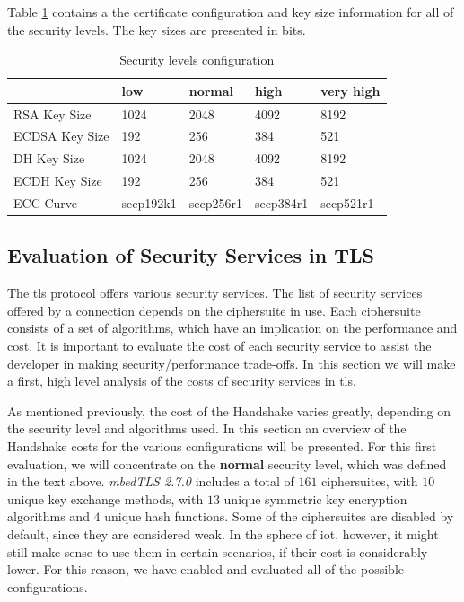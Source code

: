 Table \ref{table:sls-config-info} contains a the certificate configuration and key size information for all of the
security levels. The key sizes are presented in bits.

\begin{table}[]
\begin{tabular}{|l|l|l|l|l|}
\hline
               & \textbf{low} & \textbf{normal} & \textbf{high} & \textbf{very high} \\ \hline
RSA Key Size   & 1024         & 2048            & 4092          & 8192               \\ \hline
ECDSA Key Size & 192          & 256             & 384           & 521                \\ \hline
DH Key Size    & 1024         & 2048            & 4092          & 8192               \\ \hline
ECDH Key Size  & 192          & 256             & 384           & 521                \\ \hline
ECC Curve      & secp192k1    & secp256r1       & secp384r1     & secp521r1          \\ \hline
\end{tabular}
\centering \caption{\label{table:sls-config-info} Security levels configuration}
\end{table}

\subsection{Evaluation of Security Services in TLS} \label{sec:ss-overview}

The \gls{tls} protocol offers various security services. The list of security services offered by a connection
depends on the ciphersuite in use. Each ciphersuite consists of a set of algorithms, which have an implication
on the performance and cost. It is important to evaluate the cost of each security service to assist the developer in making
security/performance trade-offs. In this section we will make a first, high level analysis of the
costs of security services in \gls{tls}.

As mentioned previously, the cost of the Handshake varies greatly, depending on the security level and algorithms used.
In this section an overview of the Handshake costs for the various configurations will be presented. For this
first evaluation, we will concentrate on the \textbf{normal} security level, which was defined in the text above.
\textit{mbedTLS 2.7.0} includes a total of $161$ ciphersuites, with $10$ unique key exchange methods, with $13$ unique
symmetric key encryption algorithms and $4$ unique hash functions. Some of the ciphersuites are disabled by default,
since they are considered weak. In the sphere of \gls{iot}, however, it might still make sense to use them in certain
scenarios, if their cost is considerably lower. For this reason, we have enabled and evaluated all of the possible configurations.

